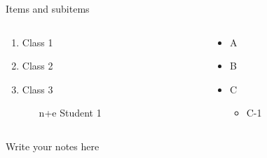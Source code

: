 \documentclass{beamer}
\begin{document}
    \begin{frame}{Items and subitems}
        \begin{columns}[t] %
            \begin{column}{0.5\textwidth}
                \begin{enumerate}
                    \item Class 1
                    \item Class 2
                    \item Class 3
                    \begin{itemize}
                        \item[n+e] Student 1
                    \end{itemize}
                \end{enumerate}
            \end{column}
            
            \begin{column}{0.5\textwidth}
               \begin{itemize}
                    \item A
                    \item B
                    \item C
                    \begin{itemize}
                        \item C-1
                    \end{itemize}
                \end{itemize}
            \end{column}
        \end{columns}

        \begin{note}
            {Write your notes here}
        \end{note}
    \end{frame}
\end{document}
